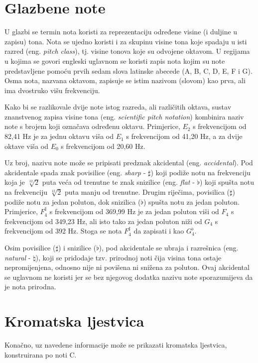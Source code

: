 \documentclass[times, utf8, zavrsni, numeric]{fer}
\begin{document}
\section{Glazbene note}
U glazbi se termin nota koristi za reprezentaciju određene visine (i duljine u zapisu) tona. Nota se ujedno koristi i za skupinu visine tona koje spadaju u isti razred (eng. \textit{pitch class}), tj. visine tonova koje su odvojene oktavom. U regijama u kojima se govori engleski uglavnom se koristi zapis nota kojim su note predstavljene pomoću prvih sedam slova latinske abecede (A, B, C, D, E, F i G). Osma nota, nazvana oktavom, zapisuje se istim nazivom (slovom) kao prva, ali ima dvostruko višu frekvenciju. 

Kako bi se razlikovale dvije note istog razreda, ali različitih oktava, sustav znanstvenog zapisa visine tona (eng. \textit{scientific pitch notation}) kombinira naziv note s brojem koji označava određenu oktavu. 
Primjerice, $E_2$ s frekvencijom od 82,41 Hz je za jednu oktavu viša od $E_1$ s frekvencijom od 41,20 Hz, a za dvije oktave viša od $E_0$ s frekvencijom od 20,60 Hz.

Uz broj, nazivu note može se pripisati predznak akcidental (eng. \textit{accidental}).\cite{pericic2008visejezicni} Pod akcidentale spada znak povisilice (eng. \textit{sharp} - $\sharp$) koji podiže notu na frekvenciju koja je $\sqrt[12]{2}$ puta veća od trenutne te znak snizilice (eng. \textit{flat} - $\flat$) koji spušta notu na frekvenciju $\sqrt[12]{2}$ puta manju od trenutne. Drugim riječima, povisilica ($\sharp$) podiže notu za jedan poluton, dok snizilica ($\flat$) spušta notu za jedan poluton.\cite{hemu_2020}
Primjerice, $F_4^\sharp$ s frekvencijom od 369,99 Hz je za jedan poluton viši od $F_4$ s frekvencijom od 349,23 Hz, ali isto tako za jedan poluton niži od $G_4$ s frekvencijom od 392 Hz. Stoga se nota $F_4^\sharp$ da zapisati i kao $G_4^\flat$.

Osim povisilice ($\sharp$) i snizilice ($\flat$), pod akcidentale se ubraja i razrešnica (eng. \textit{natural} - $\natural$), koji se pridodaje tzv. prirodnoj noti čija visina tona ostaje nepromijenjena, odnosno nije ni povišena ni snižena za poluton.\cite{benward2003introduction} Ovaj akcidental se uglavnom ne koristi jer se bez njegovog dodatka nazivu note sporazumijeva da je nota prirodna.

\section{Kromatska ljestvica}
Konačno, uz navedene informacije može se prikazati kromatska ljestvica, konstruirana po noti C.
\end{document}
